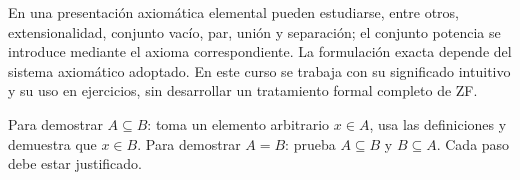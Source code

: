 \begin{lesson}[id=referencia-conjuntos,weight=0]

\begin{table}[id=referencia-conjuntos-tabla,header=teal]









\end{table}

\end{lesson}

\begin{lesson}[id=referencia-axiomas-conjuntos,weight=0]

En una presentación axiomática elemental pueden estudiarse, entre otros, extensionalidad, conjunto vacío, par, unión y separación; el conjunto potencia se introduce mediante el axioma correspondiente. La formulación exacta depende del sistema axiomático adoptado. En este curso se trabaja con su significado intuitivo y su uso en ejercicios, sin desarrollar un tratamiento formal completo de ZF.

\end{lesson}

\begin{lesson}[id=referencia-esquema-demostracion,weight=0]

Para demostrar \(A\subseteq B\): toma un elemento arbitrario \(x\in A\), usa las definiciones y demuestra que \(x\in B\). Para demostrar \(A=B\): prueba \(A\subseteq B\) y \(B\subseteq A\). Cada paso debe estar justificado.

\end{lesson}
